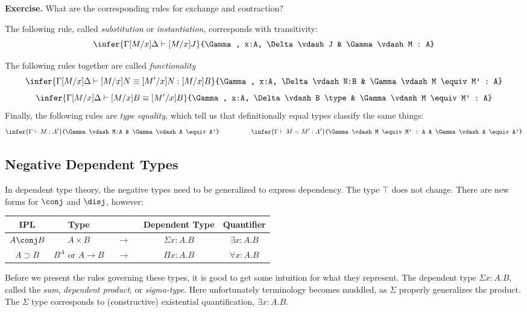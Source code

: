 \documentclass[12pt]{article}
\begin{document}
\textbf{Exercise.} What are the corresponding rules for exchange and contraction?

The following rule, called \emph{substitution} or \emph{instantiation}, corresponds with transitivity:
\begin{equation*}
\infer{\Gamma[M/x]\Delta \vdash [M/x]J}{\Gamma, x:A, \Delta \vdash J & \Gamma \vdash M : A}
\end{equation*}

The following rules together are called \emph{functionality}
\begin{equation*}
\infer{\Gamma [M/x] \Delta \vdash [M/x]N \equiv [M'/x]N : [M/x]B}{\Gamma, x:A, \Delta \vdash N:B & \Gamma \vdash M \equiv M' : A}
\end{equation*}
\begin{equation*}
\infer{\Gamma [M/x] \Delta \vdash [M/x]B \equiv [M'/x]B}{\Gamma, x:A, \Delta \vdash B \type & \Gamma \vdash M \equiv M' : A}
\end{equation*}
Finally, the following rules are \emph{type equality}, which tell us that definitionally equal types classify the same things:
\begin{equation*}
\infer{\Gamma \vdash M : A'}{\Gamma \vdash M:A & \Gamma \vdash A \equiv A'} \hspace{50pt}
\infer{\Gamma \vdash M \equiv M' : A'}{\Gamma \vdash M \equiv M' : A & \Gamma \vdash A \equiv A'}
\end{equation*}


\subsection{Negative Dependent Types}
In dependent type theory, the negative types need to be generalized to express dependency. The type $\top$ does not change. There are new forms for $\conj$ and $\disj$, however:

\begin{center}
\begin{tabular}{c c c c c}
IPL & Type & & Dependent Type & Quantifier\\\hline
$A \conj B$ & $A \times B$ & $\;\;\to\;\;$ & $\Sigma x: A. B$ & $\exists x:A.B$ \\
$A \supset B$ & $B^A$ or $A\rightarrow B$ & $\;\;\to\;\;$ & $\Pi x:A .B$ & $\forall x:A.B$ \\
\end{tabular}
\end{center}

Before we present the rules governing these types, it is good to get some intuition for what they represent. The dependent type $\Sigma x:A.B$, called the \emph{sum}, \emph{dependent product}, or \emph{sigma-type}. Here unfortunately terminology becomes muddled, as $\Sigma$ properly generalizes the product. The $\Sigma$ type corresponds to (constructive) existential quantification, $\exists x:A.B$.
\end{document}
